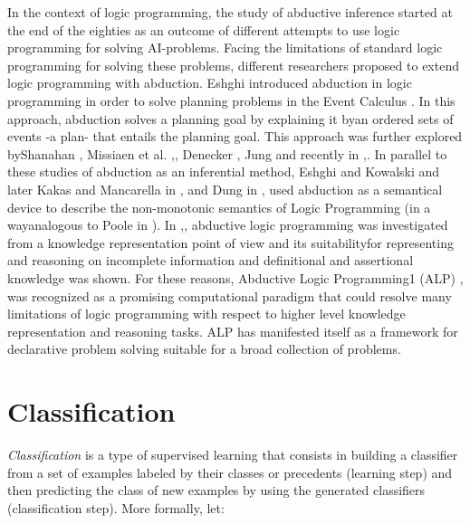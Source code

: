 In the context of logic programming, the study of abductive inference started at the end of the eighties as an outcome of different attempts to use logic programming for solving AI-problems. Facing the limitations of standard logic programming for solving these problems, different researchers proposed to extend logic programming with abduction. Eshghi \cite{Eshghi198801562579} introduced abduction in logic programming in order to solve planning problems in the Event Calculus \cite{Kowalski1989}. In this approach, abduction solves a planning goal by explaining it byan ordered sets of events -a plan- that entails the planning goal. This approach was further explored byShanahan \cite{Shanahan198901}, Missiaen et al. \cite{Eshghi198801562579},\cite{10.1093/logcom/5.5.579}, Denecker \cite{Denecker200112}, Jung \cite{SHANAHAN2000207} and recently in \cite{Kakas1998ACLPAC},\cite{KAKAS2000129}. In parallel to these studies of abduction as an inferential method, Eshghi and Kowalski \cite{Eshghi198801234235} and later Kakas and Mancarella in \cite{Kakas199001},\cite{Kakas1990OnTR} and Dung in \cite{Dung1991NegationsAH}, used abduction as a semantical device to describe the non-monotonic semantics of Logic Programming (in a wayanalogous to Poole in \cite{POOLE198827}). In \cite{Denecker2001125},\cite{10.1007/3-540-59487-6_2}, abductive logic programming was investigated from a knowledge representation point of view and its suitabilityfor representing and reasoning on incomplete information and definitional and assertional knowledge was shown. For these reasons, Abductive Logic Programming1 (ALP) \cite{10.1093/logcom/2.6.719},\cite{Kakas98therole} was recognized as a promising computational paradigm that could resolve many limitations of logic programming with respect to higher level knowledge representation and reasoning tasks. ALP has manifested itself as a framework for declarative problem solving suitable for a broad collection of problems.

\section{Classification}
\label{classification}
\textit{Classification} is a type of supervised learning that consists in building a classifier from a set of examples labeled by their classes or precedents (learning step) and then predicting the class of new examples by using the generated classifiers (classification step). More formally, let:

